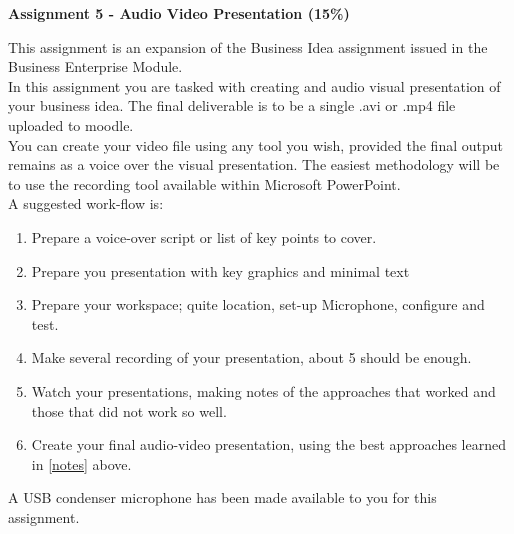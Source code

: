 

\begin{flushleft}
\Large\textbf{Assignment 5 - Audio Video Presentation (15\%)}\\
\end{flushleft}

This assignment is an expansion of the Business Idea assignment issued in the Business Enterprise Module.\\

In this assignment you are tasked with creating and audio visual presentation of your business idea.  The final deliverable is to be a single .avi or .mp4 file uploaded to moodle.\\

You can create your video file using any tool you wish, provided the final output remains as a voice over the visual presentation.  The easiest methodology will be to use the recording tool available within Microsoft PowerPoint.\\  

A suggested work-flow is:
\begin{enumerate}
	\item Prepare a voice-over script or list of key points to cover.
	\item Prepare you presentation with key graphics and minimal text
	\item Prepare your workspace; quite location, set-up Microphone, configure and test.
	\item Make several recording of your presentation, about 5 should be enough.
	\item\label{notes} Watch your presentations, making notes of the approaches that worked and those that did not work so well.
	\item Create your final audio-video presentation, using the best approaches learned in \ref{notes} above.
\end{enumerate}

A USB condenser microphone has been made available to you for this assignment.



